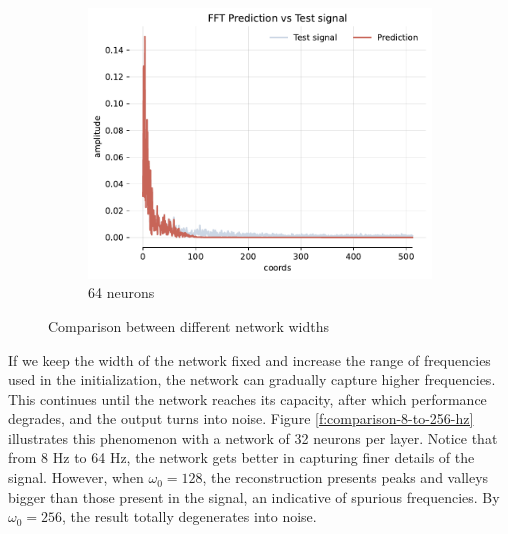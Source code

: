 \begin{figure}[!h]
\begin{subfigure}[b]{0.32\textwidth}
        \centering
        \includegraphics[width=\textwidth]{img/ch4/fft-noise-1hl-64hf-w8.pdf}
        \caption{64 neurons}
        \label{fig:fft-noise-1hl-64hf-w8}
    \end{subfigure}
    \caption{Comparison between different network widths}
    \label{f:comparison-16-32-64-hf}
\end{figure}

If we keep the width of the network fixed and increase the range of frequencies used in the initialization, the network can gradually capture higher frequencies. This continues until the network reaches its capacity, after which performance degrades, and the output turns into noise. Figure \ref{f:comparison-8-to-256-hz} illustrates this phenomenon with a network of 32 neurons per layer. Notice that from 8 Hz to 64 Hz, the network gets better in capturing finer details of the signal. However, when $\omega_0=128$, the reconstruction presents peaks and valleys bigger than those present in the signal, an indicative of spurious frequencies. By $\omega_0=256$, the result totally degenerates into noise.

